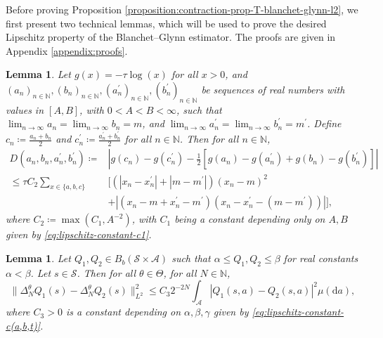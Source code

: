 \documentclass[11pt]{article}
\numberwithin{equation}{section}
\newtheorem{lemma}[theorem]{Lemma}
\theoremstyle{definition}
\theoremstyle{remark}
\def\diff{{\mathrm{d}}}
\def\N{{\mathbb{N}}}
\begin{document}
Before proving Proposition \ref{proposition:contraction-prop-T-blanchet-glynn-l2},
we first present two  technical lemmas,
which will be used to prove the desired Lipschitz property of the Blanchet–Glynn estimator.  
The proofs are given in 
  Appendix \ref{appendix:proofs}. 
\begin{lemma}
    \label{lemma:technical-taylor-lemma}
    Let $g(x) = -\tau \log (x)$ for all $x>0$,
    and   $(a_n)_{n\in \N},(b_n)_{n\in \N},(a^\prime_n)_{n\in \N},(b^\prime_n)_{n\in \N}$ be sequences of real numbers with values in $[A,B]$, with $0 < A < B < \infty$, such that $\lim_{n\to \infty} a_n=\lim_{n\to \infty} b_n= m $, and $\lim_{n\to \infty} 
 a^\prime_n = \lim_{n\to \infty} b^\prime_n= m^\prime  $. Define $c_n \coloneqq \frac{a_n + b_n}{2}$ and $c^\prime_n \coloneqq \frac{a^\prime_n + b^\prime_n}{2}$
 for all $n\in \N$. Then
 for all $n\in \N$,
    \begin{equation}
        \label{eq:technical-taylor-lemma}
        \begin{aligned}
            D(a_n,b_n,a^\prime_n,b^\prime_n)\coloneqq                  & \left| g \left( c_n \right) - g \left( c^\prime_n \right) - \frac{1}{2} \left[ g(a_n) - g(a_n ^\prime) + g(b_n) - g(b^\prime_n)  \right] \right| \\
            \leq \tau C_2 \sum_{x \in \{a,b,c\}} & \big[(|x_n - x_n^\prime| + |m - m^\prime|)(x_n - m)^2
            \\
                                                                & + \left|(x_n - m + x^\prime_n - m^\prime)(x_n - x^\prime_n - (m - m^\prime))\right|\big],
        \end{aligned}
    \end{equation}
    where   $C_2 \coloneqq \max(C_1, A^{-2})$, with $C_1$ being a constant depending only on $A,B$ given by \eqref{eq:lipschitz-constant-c1}.
\end{lemma}

\begin{lemma}
    \label{lemma:lip-delta-fixed-n}
    Let $Q_1,Q_2 \in B_b(\mathcal S \times \mathcal A)$ such that $\alpha \leq Q_1,Q_2 \leq \beta$ for real constants $\alpha < \beta$. Let $s \in \mathcal S$. Then for all $\theta \in \Theta$, for all $N \in \N$,
    \begin{equation}
        \label{eq:lip-delta-fixed-n}
        \| \Delta_N^\theta Q_1(s) - \Delta_N ^\theta Q_2(s) \|^2_{L^2} \leq C_3 2^{-2N}\int_{\mathcal A}|Q_1(s,a) - Q_2(s,a)|^2 \mu (\diff a),
    \end{equation}
    where $C_3 > 0$ is a constant depending on $\alpha,\beta,\gamma$ given by \eqref{eq:lipschitz-constant-c(a,b,t)}.
\end{lemma}
\end{document}
